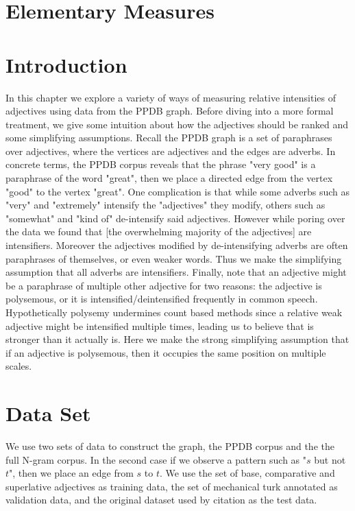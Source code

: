 \section{Elementary Measures}

\section{Introduction}

In this chapter we explore a variety of ways of measuring relative intensities of adjectives using data from the PPDB graph. Before diving into a more formal treatment, we give some intuition about how the adjectives should be ranked and some simplifying assumptions. Recall the PPDB graph is a set of paraphrases over adjectives, where the vertices are adjectives and the edges are adverbs. In concrete terms, the PPDB corpus reveals that the phrase "very good" is a paraphrase of the word "great", then we place a directed edge from the vertex "good" to the vertex "great". One complication is that while some adverbs such as "very" and "extremely" intensify the "adjectives" they modify, others such as "somewhat" and "kind of" de-intensify said adjectives. However while poring over the data we found that [the overwhelming majority of the adjectives] are intensifiers. Moreover the adjectives modified by de-intensifying adverbs are often paraphrases of themselves, or even weaker words. Thus we make the simplifying assumption that all adverbs are intensifiers. Finally, note that an adjective might be a paraphrase of multiple other adjective for two reasons: the adjective is polysemous, or it is intensified/deintensified frequently in common speech. Hypothetically polysemy undermines count based methods since a relative weak adjective might be intensified multiple times, leading us to believe that is stronger than it actually is. Here we make the strong simplifying assumption that if an adjective is polysemous, then it occupies the same position on multiple scales.

\section{Data Set}

We use two sets of data to construct the graph, the PPDB corpus and the the full N-gram corpus. In the second case if we observe a pattern such as "$s$ but not $t$", then we place an edge from $s$ to $t$. We use the set of base, comparative and superlative adjectives as training data, the set of mechanical turk annotated as validation data, and the original dataset used by {citation} as the test data. 

